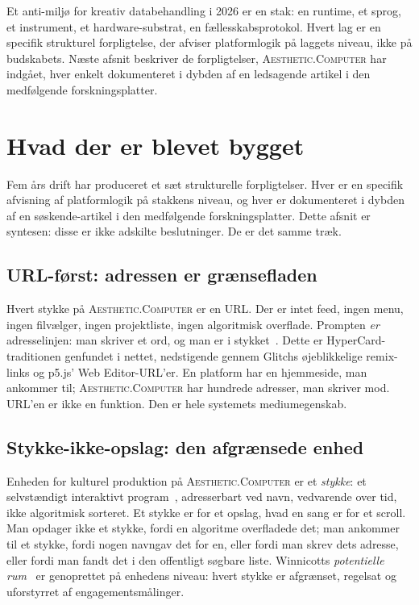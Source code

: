 \documentclass[10pt,letterpaper,twocolumn]{article}
\newcommand{\ac}{\textsc{Aesthetic.Computer}}
\begin{document}
Et anti-miljø for kreativ databehandling i 2026 er en stak: en runtime, et sprog, et instrument, et hardware-substrat, en fællesskabsprotokol. Hvert lag er en specifik strukturel forpligtelse, der afviser platformlogik på laggets niveau, ikke på budskabets. Næste afsnit beskriver de forpligtelser, \ac{} har indgået, hver enkelt dokumenteret i dybden af en ledsagende artikel i den medfølgende forskningsplatter.

\section{Hvad der er blevet bygget}

Fem års drift har produceret et sæt strukturelle forpligtelser. Hver er en specifik afvisning af platformlogik på stakkens niveau, og hver er dokumenteret i dybden af en søskende-artikel i den medfølgende forskningsplatter. Dette afsnit er syntesen: disse er ikke adskilte beslutninger. De er det samme træk.

\subsection{URL-f{\o}rst: adressen er gr{\ae}nsefladen}

Hvert stykke på \ac{} er en URL. Der er intet feed, ingen menu, ingen filvælger, ingen projektliste, ingen algoritmisk overflade. Prompten \emph{er} adresselinjen: man skriver et ord, og man er i stykket~\citep{scudder2026urltradition}. Dette er HyperCard-traditionen genfundet i nettet, nedstigende gennem Glitchs øjeblikkelige remix-links og p5.js' Web Editor-URL'er. En platform har en hjemmeside, man ankommer til; \ac{} har hundrede adresser, man skriver mod. URL'en er ikke en funktion. Den er hele systemets mediumegenskab.

\subsection{Stykke-ikke-opslag: den afgr{\ae}nsede enhed}

Enheden for kulturel produktion på \ac{} er et \emph{stykke}: et selvstændigt interaktivt program~\citep{scudder2026pieces}, adresserbart ved navn, vedvarende over tid, ikke algoritmisk sorteret. Et stykke er for et opslag, hvad en sang er for et scroll. Man opdager ikke et stykke, fordi en algoritme overfladede det; man ankommer til et stykke, fordi nogen navngav det for en, eller fordi man skrev dets adresse, eller fordi man fandt det i den offentligt søgbare liste. Winnicotts \emph{potentielle rum}~\citep{winnicott1971playing} er genoprettet på enhedens niveau: hvert stykke er afgrænset, regelsat og uforstyrret af engagementsmålinger.
\end{document}

